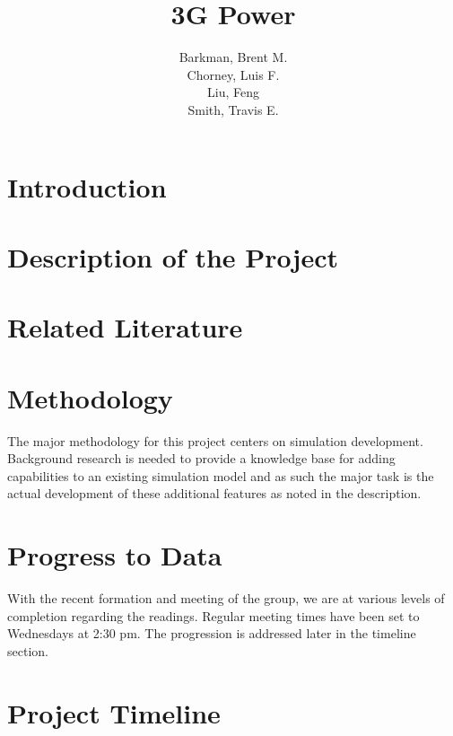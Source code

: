\documentclass{article}
\title{3G Power}
\author{Barkman, Brent M.\\ Chorney, Luis F.\\ Liu, Feng\\ Smith, Travis E.}
\begin{document}
\maketitle

\section{Introduction}

\section{Description of the Project}

\section{Related Literature}

\section{Methodology}

The major methodology for this project centers on simulation
development. Background research is needed to provide a knowledge base
for adding capabilities to an existing simulation model and as such
the major task is the actual development of these additional features
as noted in the description.

\section{Progress to Data}

With the recent formation and meeting of the group, we are at various
levels of completion regarding the readings. Regular meeting times
have been set to Wednesdays at 2:30 pm. The progression is addressed
later in the timeline section.

\section{Project Timeline}
\end{document}
